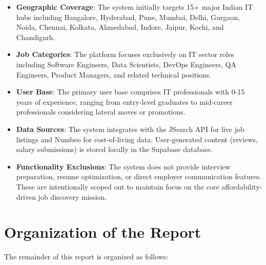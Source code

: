 \begin{itemize}
    \item \textbf{Geographic Coverage}: The system initially targets 15+ major Indian IT hubs including Bangalore, Hyderabad, Pune, Mumbai, Delhi, Gurgaon, Noida, Chennai, Kolkata, Ahmedabad, Indore, Jaipur, Kochi, and Chandigarh.
    
    \item \textbf{Job Categories}: The platform focuses exclusively on IT sector roles including Software Engineers, Data Scientists, DevOps Engineers, QA Engineers, Product Managers, and related technical positions.
    
    \item \textbf{User Base}: The primary user base comprises IT professionals with 0-15 years of experience, ranging from entry-level graduates to mid-career professionals considering lateral moves or promotions.
    
    \item \textbf{Data Sources}: The system integrates with the JSearch API for live job listings and Numbeo for cost-of-living data. User-generated content (reviews, salary submissions) is stored locally in the Supabase database.
    
    \item \textbf{Functionality Exclusions}: The system does not provide interview preparation, resume optimization, or direct employer communication features. These are intentionally scoped out to maintain focus on the core affordability-driven job discovery mission.
\end{itemize}

\section{Organization of the Report}

The remainder of this report is organized as follows:

